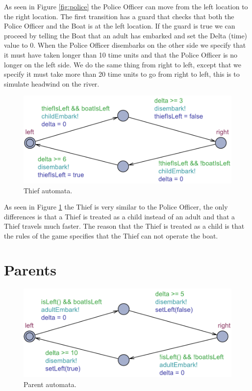 \documentclass[a4paper,12pt]{scrartcl}
\begin{document}
As seen in Figure \ref{fig:police} the Police Officer can move from the left location to the right location. The first transition has a guard that checks that both the Police Officer and the Boat is at the left location. If the guard is true we can proceed by telling the Boat that an adult has embarked and set the Delta (time) value to 0. When the Police Officer disembarks on the other side we specify that it must have taken longer than 10 time units and that the Police Officer is no longer on the left side.
We do the same thing from right to left, except that we specify it must take more than 20 time units to go from right to left, this is to simulate headwind on the river.

\begin{figure}[h!]
\centering
\includegraphics[width=0.7\linewidth]{Thief.pdf}
\caption{Thief automata.}
\label{fig:thief}
\end{figure}

As seen in Figure \ref{fig:thief} the Thief is very similar to the Police Officer, the only differences is that a Thief is treated as a child instead of an adult and that a Thief travels much faster. The reason that the Thief is treated as a child is that the rules of the game specifies that the Thief can not operate the boat.

\section*{Parents}

\begin{figure}[h!]
\centering
\includegraphics[width=0.7\linewidth]{Parent.pdf}
\caption{Parent automata.}
\label{fig:parent}
\end{figure}
\end{document}
